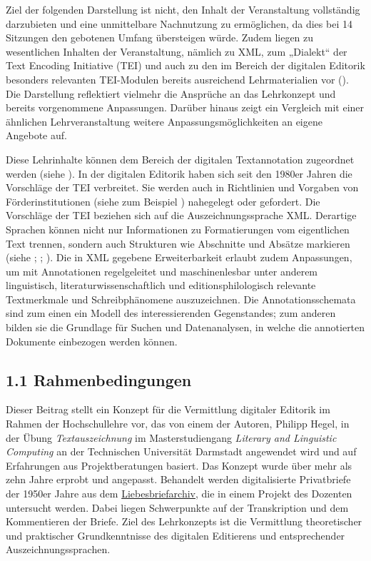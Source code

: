 \documentclass[
          a4paper,
        ]{article}
\begin{document}
Ziel der folgenden Darstellung ist nicht, den Inhalt der Veranstaltung
vollständig darzubieten und eine unmittelbare Nachnutzung zu
ermöglichen, da dies bei 14 Sitzungen den gebotenen Umfang übersteigen
würde. Zudem liegen zu wesentlichen Inhalten der Veranstaltung, nämlich
zu XML, zum „Dialekt`` der Text Encoding Initiative (TEI) und auch zu
den im Bereich der digitalen Editorik besonders relevanten TEI-Modulen
bereits ausreichend Lehrmaterialien vor
(). Die Darstellung
reflektiert vielmehr die Ansprüche an das Lehrkonzept und bereits
vorgenommene Anpassungen. Darüber hinaus zeigt ein Vergleich mit einer
ähnlichen Lehrveranstaltung weitere Anpassungsmöglichkeiten an eigene
Angebote auf.

Diese Lehrinhalte können dem Bereich der digitalen Textannotation
zugeordnet werden (siehe ). In
der digitalen Editorik haben sich seit den 1980er Jahren die Vorschläge
der TEI verbreitet. Sie werden auch in Richtlinien und Vorgaben von
Förderinstitutionen (siehe zum Beispiel ) nahegelegt oder gefordert. Die Vorschläge
der TEI beziehen sich auf die Auszeichnungssprache XML. Derartige
Sprachen können nicht nur Informationen zu Formatierungen vom
eigentlichen Text trennen, sondern auch Strukturen wie Abschnitte und
Absätze markieren (siehe ;
;
). Die in
XML gegebene Erweiterbarkeit erlaubt zudem Anpassungen, um mit
Annotationen regelgeleitet und maschinenlesbar unter anderem
linguistisch, literaturwissenschaftlich und editionsphilologisch
relevante Textmerkmale und Schreibphänomene auszuzeichnen. Die
Annotationsschemata sind zum einen ein Modell des interessierenden
Gegenstandes; zum anderen bilden sie die Grundlage für Suchen und
Datenanalysen, in welche die annotierten Dokumente einbezogen werden
können.

\subsection{1.1 Rahmenbedingungen}\label{rahmenbedingungen}

Dieser Beitrag stellt ein Konzept für die Vermittlung digitaler Editorik
im Rahmen der Hochschullehre vor, das von einem der Autoren, Philipp
Hegel, in der Übung \emph{Textauszeichnung} im Masterstudiengang
\emph{Literary and Linguistic Computing} an der Technischen Universität
Darmstadt angewendet wird und auf Erfahrungen aus Projektberatungen
basiert. Das Konzept wurde über mehr als zehn Jahre erprobt und
angepasst. Behandelt werden digitalisierte Privatbriefe der 1950er Jahre
aus dem \href{https://liebesbriefarchiv.de/}{Liebesbriefarchiv}, die in
einem Projekt des Dozenten untersucht werden. Dabei liegen Schwerpunkte
auf der Transkription und dem Kommentieren der Briefe. Ziel des
Lehrkonzepts ist die Vermittlung theoretischer und praktischer
Grundkenntnisse des digitalen Editierens und entsprechender
Auszeichnungssprachen.
\end{document}
